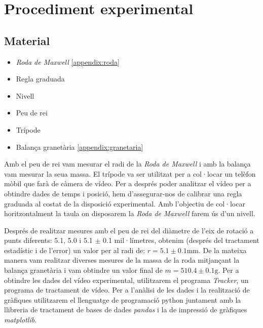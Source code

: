 \documentclass[11pt]{article}
\begin{document}
        
\clearpage
\section{Procediment experimental}
    \subsection{Material}
        \begin{multicols}{2}
            \begin{itemize}
                \item \textit{Roda de Maxwell} \ref{appendix:roda}
                \item Regla graduada
                \item Nivell
                \item Peu de rei
                \item Trípode
                \item Balança granetària \ref{appendix:granetaria}
            \end{itemize}
        \end{multicols}
        
        Amb el peu de rei vam mesurar el radi de la \textit{Roda de Maxwell} i amb la balança vam mesurar la seua massa. El trípode va ser utilitzat per a col·locar un telèfon mòbil que farà de càmera de vídeo. Per a després poder analitzar el vídeo per a obtindre dades de temps i posició, hem d'assegurar-nos de calibrar una regla graduada al costat de la disposició experimental. Amb l'objectiu de col·locar horitzontalment la taula on disposarem la \textit{Roda de Maxwell} farem ús d'un nivell.

        \vspace{0.4cm}Després de realitzar mesures amb el peu de rei del diàmetre de l'eix de rotació a punts diferents: 5.1, 5.0 i 5.1 $\pm$ 0.1 mil·límetres, obtenim (després del tractament estadístic i de l'error) un valor per al radi de: $r = 5.1 \pm 0.1$mm. De la mateixa manera vam realitzar diverses mesures de la massa de la roda mitjançant la balança granetària i vam obtindre un valor final de $m = 510.4\pm0.1\si{\gram}$. Per a obtindre les dades del vídeo experimental, utilitzarem el programa \textit{Tracker}, un programa de tractament de vídeo. Per a l'anàlisi de les dades i la realització de gràfiques utilitzarem el llenguatge de programació python juntament amb la llibreria de tractament de bases de dades \textit{pandas} i la de impressió de gràfiques \textit{matplotlib}.
\end{document}
